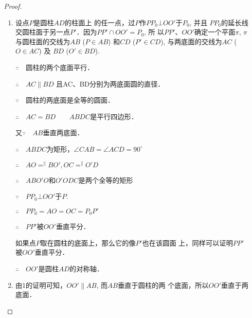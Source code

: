 \begin{figure}[htp]
    \centering
{}
    \caption{}
\end{figure}


\begin{proof}
\begin{enumerate}
    \item 

设点$P$是圆柱$AD$的柱面上
的任一点，过$P$作$PP_0\bot OO'$于$P_0$, 并且
$PP_0$的延长线交圆柱面于另一点$P'$．因为$PP'\cap OO'=P_0$, 所
以$PP'$、$OO'$确定一个平面$\pi$, $\pi$与圆柱面的交线为$AB$ ($P\in
AB$) 和$CD$ ($P'\in CD$), 与两底面的交线为$AC$ ($O\in AC$) 及
$BD$ ($O'\in BD$).

$\because\quad $圆柱的两个底面平行．

$\therefore\quad AC\parallel BD$ 且AC、BD分别为两底面圆的直径．

$\because\quad $圆柱的两底面是全等的圆面．

$\therefore\quad AC=BD\qquad ABDC$是平行四边形．

又$\because\quad AB$垂直两底面．

$\therefore\quad ABDC$为矩形，$\angle CAB=\angle ACD=90^{\circ}$

$\therefore\quad AO\displaystyle\mathop{=}^{\parallel}BO', OC\displaystyle\mathop{=}^{\parallel}O'D$

$\therefore\quad ABO'O$和$O'ODC$是两个全等的矩形

$\because\quad PP_0\bot OO'$于$P$.

$\therefore\quad PP_0=AO=OC=P_0P'$

$\therefore\quad PP'$被$OO'$垂直平分．

如果点$P$取在圆柱的底面上，那么它的像$P'$也在该圆面
上，同样可以证明$PP'$被$OO'$垂直平分．

$\therefore\quad OO'$是圆柱$AD$的对称轴．

\item 由1的证明可知，$OO'\parallel AB$, 而$AB$垂直于圆柱的两
个底面，所以$OO'$垂直于两底面．
\end{enumerate}
\end{proof}

